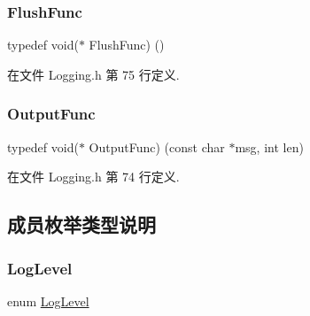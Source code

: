 \subsubsection{\texorpdfstring{Flush\+Func}{FlushFunc}}
{\footnotesize\ttfamily typedef void($\ast$ Flush\+Func) ()}



在文件 Logging.\+h 第 75 行定义.

\mbox{\label{classmuduo_1_1Logger_a34167efc62501fda5dcd3e2c81a3497b}} 
\subsubsection{\texorpdfstring{Output\+Func}{OutputFunc}}
{\footnotesize\ttfamily typedef void($\ast$ Output\+Func) (const char $\ast$msg, int len)}



在文件 Logging.\+h 第 74 行定义.



\subsection{成员枚举类型说明}
\mbox{\label{classmuduo_1_1Logger_aca1fd1d8935433e6ba2e3918214e07f9}} 
\subsubsection{\texorpdfstring{Log\+Level}{LogLevel}}
{\footnotesize\ttfamily enum \hyperlink{classmuduo_1_1Logger_aca1fd1d8935433e6ba2e3918214e07f9}{Log\+Level}}


